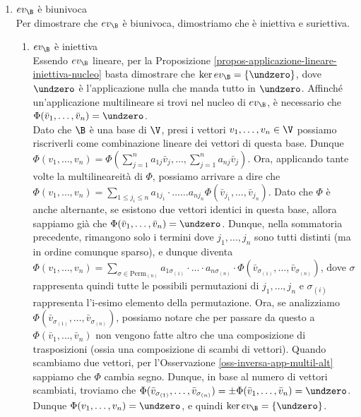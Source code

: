 \documentclass[11pt, a4paper, titlepage, oneside]{scrbook}
\begin{document}
\begin{enumerate}[label=\arabic*°]
    \item $ev_\B$ è biunivoca \\
    Per dimostrare che $ev_\B$ è biunivoca, dimostriamo che è iniettiva e suriettiva.
    \begin{enumerate}[label=\arabic*°]
        \item $ev_\B$ è iniettiva \\
        Essendo $ev_\B$ lineare, per la Proposizione \ref{propos-applicazione-lineare-iniettiva-nucleo} basta dimostrare che $\ker ev_\B = \{\undzero\}$, dove $\undzero$ è l'applicazione nulla che manda tutto in $\undzero$. Affinché un'applicazione multilineare si trovi nel nucleo di $ev_\B$, è necessario che $\Phi(\bar{v}_1, \ldots, \bar{v}_n) = \undzero$. \\
        Dato che $\B$ è una base di $\V$, presi i vettori $v_1, \ldots, v_n \in \V$ possiamo riscriverli come combinazione lineare dei vettori di questa base. Dunque \mbox{$\Phi(v_1, \ldots, v_n) = \Phi(\sum_{j = 1}^n a_{1j} \bar{v}_j, \ldots, \sum_{j = 1}^n a_{nj} \bar{v}_j)$}. Ora, applicando tante volte la multilineareità di $\Phi$, possiamo arrivare a dire che \mbox{$\Phi(v_1, \ldots, v_n) = \sum_{1 \leq j_i \leq n} a_{1 j_1} \cdot \ldots \dots a_{nj_n} \Phi(\bar{v}_{j_1}, \ldots, \bar{v}_{j_n})$}. Dato che $\Phi$ è anche alternante, se esistono due vettori identici in questa base, allora sappiamo già che $\Phi(\bar{v}_1, \ldots, \bar{v}_n) = \undzero$. Dunque, nella sommatoria precedente, rimangono solo i termini dove $j_1, \ldots, j_n$ sono tutti distinti (ma in ordine comunque sparso), e dunque diventa \mbox{$\Phi(v_1, \ldots, v_n) = \sum_{\sigma \in \mathrm{Perm}_{(n)}} a_{1 \sigma_{(1)}} \cdot \ldots \cdot a_{n \sigma_{(n)}} \cdot \Phi(\bar{v}_{\sigma_{(1)}}, \ldots, \bar{v}_{\sigma_{(n)}})$}, dove $\sigma$ rappresenta quindi tutte le possibili permutazioni di $j_1, \ldots, j_n$ e $\sigma_{(i)}$ rappresenta l'i-esimo elemento della permutazione. 
        Ora, se analizziamo $\Phi(\bar{v}_{\sigma_{(1)}}, \ldots, \bar{v}_{\sigma_{(n)}})$, possiamo notare che per passare da questo a $\Phi(\bar{v}_1, \ldots, \bar{v}_n)$ non vengono fatte altro che una composizione di trasposizioni (ossia una composizione di scambi di vettori). Quando scambiamo due vettori, per l'Osservazione \ref{oss-inversa-app-multil-alt} sappiamo che $\Phi$ cambia segno. Dunque, in base al numero di vettori scambiati, troviamo che \mbox{$\Phi(\bar{v}_{\sigma_{(1)}}, \ldots, \bar{v}_{\sigma_{(n)}}) = \pm \Phi(\bar{v}_1, \ldots, \bar{v}_n) = \undzero$}. Dunque $\Phi(v_1, \ldots, v_n) = \undzero$, e quindi $\ker ev_\B = \{\undzero\}$.

\end{enumerate}
\end{enumerate}
\end{document}
